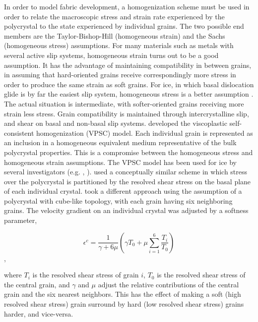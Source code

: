 \documentclass{igs}
\begin{document}
In order to model fabric development, a homogenization scheme must be used in order to relate the macroscopic stress and strain rate experienced by the polycrystal to the state experienced by individual grains. The two possible end members are the Taylor-Bishop-Hill (homogeneous strain) \citep{taylor} and the Sachs (homogeneous stress) \citep{sachs} assumptions. For many materials such as metals with several active slip systems, homogeneous strain turns out to be a good assumption. It has the advantage of maintaining compatibility in between grains, in assuming that hard-oriented grains receive correspondingly more stress in order to produce the same strain as soft grains. For ice, in which basal dislocation glide is by far the easiest slip system, homogeneous stress is a better assumption \citep{thorsteinsson2002nni}. The actual situation is intermediate, with softer-oriented grains receiving more strain less stress. Grain compatibility is maintained through intercrystalline slip, and shear on basal and non-basal slip systems. \citet{molinari} developed the viscoplastic self-consistent homogenization (VPSC) model. Each individual grain is represented as an inclusion in a homogeneous equivalent medium representative of the bulk polycrystal properties. This is a compromise between the homogeneous stress and homogeneous strain assumptions. The VPSC model has been used for ice by several investigators (e.g. \citet{gillet2005}, \citet{castelnau1997}). \citet{azuma96} used a conceptually similar scheme in which stress over the polycrystal is partitioned by the resolved shear stress on the basal plane of each individual crystal. \citet{thorsteinsson2002nni} took a different approach using the assumption of a polycrystal with cube-like topology, with each grain having six neighboring grains. The velocity gradient on an individual crystal was adjusted by a softness parameter,

\begin{equation}
\epsilon^c = \frac {1}{\gamma + 6 \mu} \left( \gamma T_0 + \mu \sum_{i=1}^6 \frac{T_i}{T_0} \right)
\end{equation},

where $T_i$ is the resolved shear stress of grain $i$, $T_0$ is the resolved shear stress of the central grain, and $\gamma$ and $\mu$ adjust the relative contributions of the central grain and the six nearest neighbors. This has the effect of making a soft (high resolved shear stress) grain surround by hard (low resolved shear stress) grains harder, and vice-versa.
\end{document}
